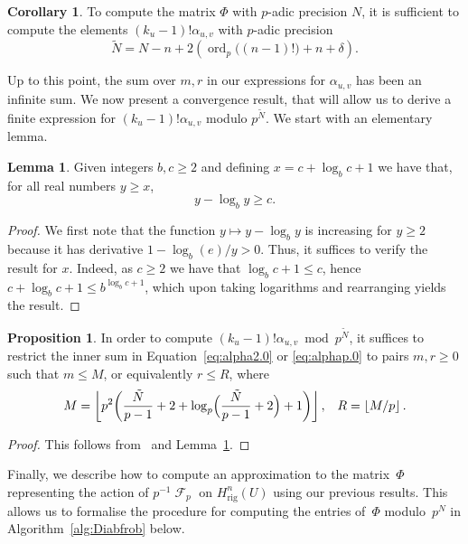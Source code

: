 \documentclass[a4paper,11pt]{article}
\numberwithin{equation}{section}
\providecommand{\floor}[1]{\left\lfloor#1\right\rfloor}   %
\DeclareMathOperator{\ord}{ord}          %
\DeclareMathOperator{\Frob}{\mathcal{F}} %
\providecommand{\Hrig}{H_{\text{rig}}}  %
\theoremstyle{definition}
\newtheorem{lem}[thm]{Lemma}
\newtheorem{prop}[thm]{Proposition}
\newtheorem{cor}[thm]{Corollary}
\begin{document}
\begin{cor}
To compute the matrix $\Phi$ with $p$-adic precision $N$, it is sufficient to compute the elements 
$(k_u-1)!\alpha_{u,v}$ with $p$-adic precision
\begin{equation}
\tilde{N}=N-n+2(\ord_p\bigl((n-1)!\bigr)+n+\delta).
\end{equation}
\end{cor}

Up to this point, the sum over $m,r$ in our expressions 
for $\alpha_{u,v}$ has been an infinite sum.  We now present 
a convergence result, that will allow us to derive a finite 
expression for $(k_u-1)!\alpha_{u,v}$ modulo $p^{\tilde{N}}$. We
start with an elementary lemma.

\begin{lem} \label{lem:log}
Given integers $b,c \geq 2$ and defining $x = c + \log_b c + 1$ 
we have that, for all real numbers $y \geq x$, 
\begin{equation}
y - \log_b y \geq c.
\end{equation}
\end{lem}

\begin{proof}
We first note that the function $y \mapsto y - \log_b y$ is increasing 
for $y \geq 2$ because it has derivative $1 - \log_b(e)/y > 0$.  Thus, it 
suffices to verify the result for $x$.  Indeed, as $c \geq 2$ we have 
that $\log_b c + 1 \leq c$, hence $c + \log_b c + 1 \leq b^{\log_b c + 1}$,
which upon taking logarithms and rearranging yields the result.
\end{proof}

\begin{prop}
In order to compute $(k_u-1)!\alpha_{u,v} \bmod p^{\tilde{N}}$, it 
suffices to restrict the inner sum in Equation~\eqref{eq:alpha2.0} or 
\eqref{eq:alphap.0} to pairs $m,r \geq 0$ such that $m \leq M$, or 
equivalently $r \leq R$, where 
\begin{equation}
M = \floor{ p^2 \biggl( \frac{\tilde{N}}{p-1} +2 
            + \log_p\Bigl(\frac{\tilde{N}}{p-1} + 2\Bigr) + 1 \biggr)}, \; \; \; R=\floor{M/p}.
\end{equation}
\end{prop}

\begin{proof}
This follows from~\citep[\S 6.2]{Lauder2004b} and Lemma~\ref{lem:log}.
\end{proof}

Finally, we describe how to compute an approximation to the matrix~$\Phi$ 
representing the action of $p^{-1} \Frob_p$ on $\Hrig^{n}(U)$ using our 
previous results. This allows us to formalise the procedure for computing 
the entries of~$\Phi$ modulo~$p^N$ in Algorithm~\ref{alg:Diabfrob} 
below.
\end{document}
